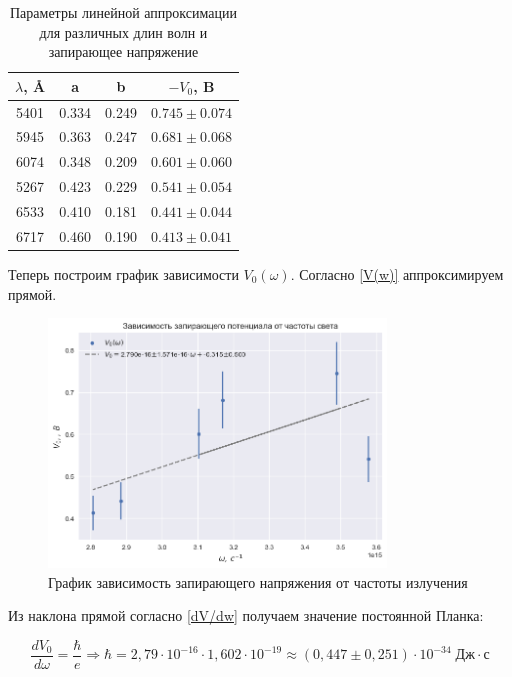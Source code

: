 \documentclass[a4paper, 12pt]{article}
\begin{document}
\begin{table}[h!]
	\begin{center}
			\begin{tabular}{|c|c|c|c|}
			\hline
			$\lambda$, \AA & a & b & $-V_0$, B \\ 
			\hline 
			5401 & 0.334 & 0.249 & $0.745\pm0.074$ \\ 
			\hline 
			5945 & 0.363 & 0.247 & $0.681\pm0.068$ \\ 
			\hline 
			6074 & 0.348 & 0.209 & $0.601\pm0.060$ \\ 
			\hline 
			5267 & 0.423 & 0.229 & $0.541\pm0.054$ \\ 
			\hline 
			6533 & 0.410 & 0.181 & $0.441\pm0.044$ \\ 
			\hline
			6717 & 0.460 & 0.190 & $0.413\pm0.041$ \\ 
			\hline  
			\end{tabular} 
	\end{center}
	\caption{Параметры линейной аппроксимации для различных длин волн и запирающее напряжение} 
	\label{tab:V}
\end{table}

Теперь построим график зависимости $ V_0(\omega) $. Согласно \eqref{V(w)} аппроксимируем прямой.

\begin{figure}[h]
\begin{center}
\includegraphics[width = 0.8\textwidth]{V0(w).png}
\caption{График зависимость запирающего напряжения от частоты излучения}
\label{fig:V0(w)}
\end{center}
\end{figure}

Из наклона прямой согласно \eqref{dV/dw} получаем значение постоянной Планка:
	
	\begin{equation}\label{}
	\frac{dV_0}{d\omega} = \frac{\hbar}{e} \Rightarrow \hbar = 2,79 \cdot 10^{-16} \cdot 1,602 \cdot 10^{-19} \approx (0,447 \pm 0,251) \cdot 10^{-34} \; Дж \cdot с 
	\end{equation}
	
\end{document}
